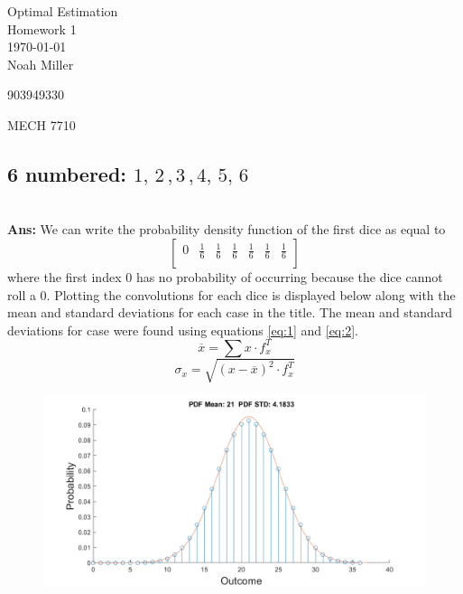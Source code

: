 \documentclass[12pt,letterpaper, onecolumn]{exam}
\begin{document}
\begingroup
\centering
\LARGE Optimal Estimation\\
\LARGE Homework 1 \\[0.5em]
\large \today\\[0.5em]
\large Noah Miller\par
\large 903949330\par
\large MECH 7710\par
\endgroup
\pointsdroppedatright   %
\printanswers
\renewcommand{\solution}{\noindent\textbf{Ans:}\enspace}   %

\begin{questions}
	\begin{parts}
		\part{6 numbered: $1,\,2\,,3\,,4,\,5,\,6$}\\
		\solution
		We can write the probability density function of the first dice as equal to
		\[
			\begin{bmatrix}
				0 & \frac{1}{6} & \frac{1}{6} & \frac{1}{6} & \frac{1}{6} & \frac{1}{6} & \frac{1}{6} \\
			\end{bmatrix} \]
		where the first index $0$ has no probability of occurring because the dice cannot roll a 0. Plotting the convolutions for each dice is displayed below along with the mean and standard deviations for each case in the title. The mean and standard deviations for case were found using equations \ref{eq:1} and \ref{eq:2}.
		\begin{equation}\label{eq:1}
			\overline{x} = \sum x \cdot f_x^T
		\end{equation}
		\begin{equation}\label{eq:2}
			\sigma_x = \sqrt{(x - \overline{x})^2 \cdot f_x^T}
		\end{equation}
		\begin{figure}[!h]
			\centering
			\includegraphics[width=.91\linewidth]{Q1_a.png}
		\end{figure}
		\clearpage

\end{parts}
\end{questions}
\end{document}
